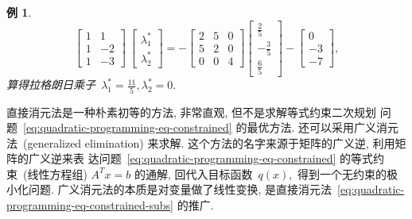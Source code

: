\documentclass{SBCbookchapter}
\newtheorem{exam}[thm]{例}
\numberwithin{equation}{section}
\begin{document}
\begin{exam}
\begin{equation*}
\begin{bmatrix} 1 & 1 \\ 1 & -2 \\ 1 & -3 \end{bmatrix} ~ \begin{bmatrix} \lambda_1^* \\ \lambda_2^* \end{bmatrix} = - \begin{bmatrix} 2 & 5 & 0 \\ 5 & 2 & 0 \\ 0 & 0 & 4 \end{bmatrix} \begin{bmatrix} \frac{2}{5} \\ -\frac{3}{5} \\ \frac{6}{5} \end{bmatrix} - \begin{bmatrix} 0 \\ -3 \\ -7 \end{bmatrix},
\end{equation*}
算得拉格朗日乘子~$\lambda_1^* = \frac{11}{5}, \lambda_2^* = 0.$
\end{exam}

直接消元法是一种朴素初等的方法, 非常直观, 但不是求解等式约束二次规划
问题~\eqref{eq:quadratic-programming-eq-constrained} 的最优方法. 还可以采用广义消元法~(generalized elimination) 来求解. 这个方法的名字来源于矩阵的广义逆, 利用矩阵的广义逆来表
达问题~\eqref{eq:quadratic-programming-eq-constrained} 的等式约束~(线性方程组) $A^T {x} = {b}$ 的通解, 回代入目标函数~$q({x}),$ 得到一个无约束的极小化问题. 广义消元法的本质是对变量做了线性变换, 是直接消元法~\eqref{eq:quadratic-programming-eq-constrained-subs} 的推广.
\end{document}

